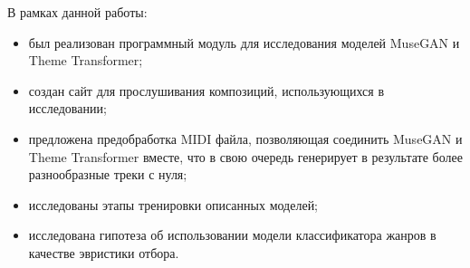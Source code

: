 В рамках данной работы:
\begin{itemize}
    \item был реализован программный модуль для исследования моделей MuseGAN и Theme Transformer;
    \item создан сайт для прослушивания композиций, использующихся в исследовании;
    \item предложена предобработка MIDI файла, позволяющая соединить MuseGAN и Theme Transformer вместе, что в свою очередь генерирует в результате более разнообразные треки с нуля;
    \item исследованы этапы тренировки описанных моделей;
    \item исследована гипотеза об использовании модели классификатора жанров в качестве эвристики отбора.
\end{itemize}
